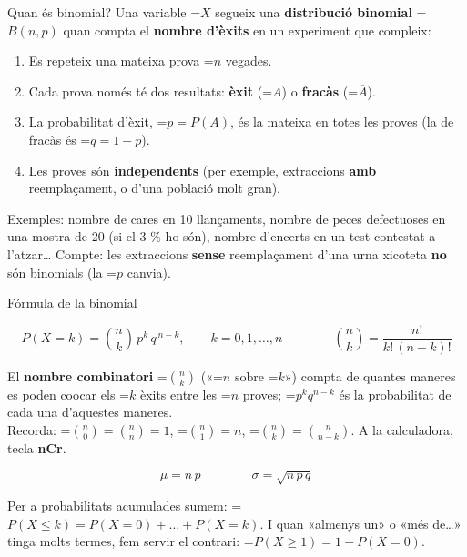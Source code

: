 \documentclass[11pt,a4paper]{article}
\newcommand{\fmm}[1]{\setbox0=\hbox{$#1$}\ifdim\wd0>\linewidth\[#1\]\else\mbox{\box0}\fi}
\begin{document}
  

  
\begin{fmdef}{Quan és binomial?}
Una variable \fmm{X} segueix una \textbf{distribució binomial} \fmm{B(n,p)} quan compta el \textbf{nombre d'èxits} en un experiment que compleix:

      
\begin{enumerate}
\item Es repeteix una mateixa prova \fmm{n} vegades.
\item Cada prova només té dos resultats: \textbf{èxit} (\fmm{A}) o \textbf{fracàs} (\fmm{\overline A}).
\item La probabilitat d'èxit, \fmm{p=P(A)}, és la mateixa en totes les proves (la de fracàs és \fmm{q=1-p}).
\item Les proves són \textbf{independents} (per exemple, extraccions \textbf{amb} reemplaçament, o d'una població molt gran).
\end{enumerate}

      
\begin{fmnote}Exemples: nombre de cares en 10 llançaments, nombre de peces defectuoses en una mostra de 20 (si el 3 \% ho són), nombre d'encerts en un test contestat a l'atzar\dots{} Compte: les extraccions \textbf{sense} reemplaçament d'una urna xicoteta \textbf{no} són binomials (la \fmm{p} canvia).\end{fmnote}
\end{fmdef}

  
\begin{fmprop}{Fórmula de la binomial}

\[P(X=k)=\binom{n}{k}\,p^k\,q^{\,n-k},\qquad k=0,1,\dots,n\qquad\qquad\binom nk=\frac{n!}{k!\,(n-k)!}\]

      

El \textbf{nombre combinatori} \fmm{\binom nk} («\fmm{n} sobre \fmm{k}») compta de quantes maneres es poden co\lgem{}ocar els \fmm{k} èxits entre les \fmm{n} proves; \fmm{p^kq^{n-k}} és la probabilitat de cada una d'aquestes maneres. \\
Recorda: \fmm{\binom n0=\binom nn=1}, \fmm{\binom n1=n}, \fmm{\binom nk=\binom n{n-k}}. A la calculadora, tecla \textbf{nCr}.

      
\[\mu=n\,p\qquad\qquad\sigma=\sqrt{n\,p\,q}\]

      

Per a probabilitats acumulades sumem: \fmm{P(X\leq k)=P(X=0)+\dots+P(X=k)}. I quan «almenys un» o «més de\dots{}» tinga molts termes, fem servir el contrari: \fmm{P(X\geq1)=1-P(X=0)}.
\end{fmprop}
\end{document}
